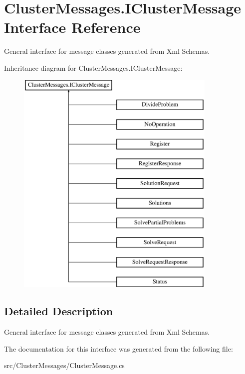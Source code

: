 \hypertarget{interface_cluster_messages_1_1_i_cluster_message}{}\section{Cluster\+Messages.\+I\+Cluster\+Message Interface Reference}
\label{interface_cluster_messages_1_1_i_cluster_message}


General interface for message classes generated from Xml Schemas.  


Inheritance diagram for Cluster\+Messages.\+I\+Cluster\+Message\+:\begin{figure}[H]
\begin{center}
\leavevmode
\includegraphics[height=11.000000cm]{interface_cluster_messages_1_1_i_cluster_message}
\end{center}
\end{figure}


\subsection{Detailed Description}
General interface for message classes generated from Xml Schemas. 



The documentation for this interface was generated from the following file\+:\begin{DoxyCompactItemize}
\item 
src/\+Cluster\+Messages/Cluster\+Message.\+cs\end{DoxyCompactItemize}
